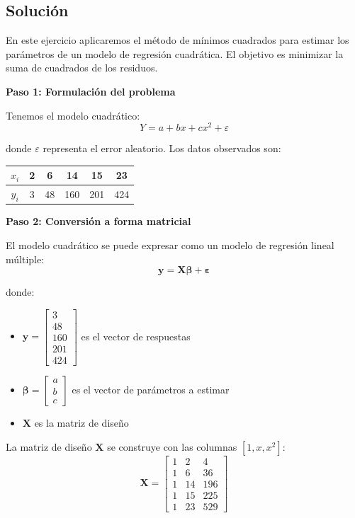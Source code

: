\documentclass[11pt,a4paper]{article}
\begin{document}
\subsection{Solución}

En este ejercicio aplicaremos el método de mínimos cuadrados para estimar los parámetros de un modelo de regresión cuadrática. El objetivo es minimizar la suma de cuadrados de los residuos.

\textbf{Paso 1: Formulación del problema}

Tenemos el modelo cuadrático:
\[
Y = a + bx + cx^2 + \varepsilon
\]

donde $\varepsilon$ representa el error aleatorio. Los datos observados son:
\begin{center}
\begin{tabular}{|c|c|c|c|c|c|}
\hline
$x_i$ & 2 & 6 & 14 & 15 & 23 \\
\hline
$y_i$ & 3 & 48 & 160 & 201 & 424 \\
\hline
\end{tabular}
\end{center}

\textbf{Paso 2: Conversión a forma matricial}

El modelo cuadrático se puede expresar como un modelo de regresión lineal múltiple:
\[
\mathbf{y} = \mathbf{X}\boldsymbol{\beta} + \boldsymbol{\varepsilon}
\]

donde:
\begin{itemize}
    \item $\mathbf{y} = \begin{bmatrix} 3 \\ 48 \\ 160 \\ 201 \\ 424 \end{bmatrix}$ es el vector de respuestas
    \item $\boldsymbol{\beta} = \begin{bmatrix} a \\ b \\ c \end{bmatrix}$ es el vector de parámetros a estimar
    \item $\mathbf{X}$ es la matriz de diseño
\end{itemize}

La matriz de diseño $\mathbf{X}$ se construye con las columnas $[1, x, x^2]$:
\[
\mathbf{X} = \begin{bmatrix}
1 & 2 & 4 \\
1 & 6 & 36 \\
1 & 14 & 196 \\
1 & 15 & 225 \\
1 & 23 & 529
\end{bmatrix}
\]
\end{document}
